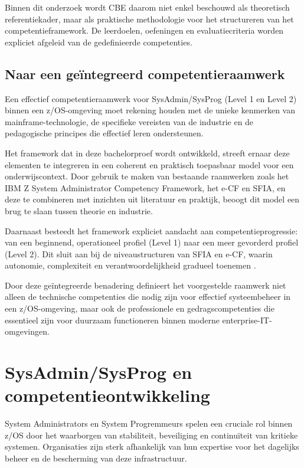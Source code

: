 Binnen dit onderzoek wordt CBE daarom niet enkel beschouwd als theoretisch referentiekader, maar als praktische methodologie voor het structureren van het competentieframework. De leerdoelen, oefeningen en evaluatiecriteria worden expliciet afgeleid van de gedefinieerde competenties.

\subsection{Naar een geïntegreerd competentieraamwerk}

Een effectief competentieraamwerk voor SysAdmin/SysProg (Level 1 en Level 2) binnen een z/OS-omgeving moet rekening houden met de unieke kenmerken van mainframe-technologie, de specifieke vereisten van de industrie en de pedagogische principes die effectief leren ondersteunen.

Het framework dat in deze bachelorproef wordt ontwikkeld, streeft ernaar deze elementen te integreren in een coherent en praktisch toepasbaar model voor een onderwijscontext. Door gebruik te maken van bestaande raamwerken zoals het IBM Z System Administrator Competency Framework, het e-CF en SFIA, en deze te combineren met inzichten uit literatuur en praktijk, beoogt dit model een brug te slaan tussen theorie en industrie.

Daarnaast besteedt het framework expliciet aandacht aan competentieprogressie: van een beginnend, operationeel profiel (Level 1) naar een meer gevorderd profiel (Level 2). Dit sluit aan bij de niveaustructuren van SFIA en e-CF, waarin autonomie, complexiteit en verantwoordelijkheid gradueel toenemen \autocite{sfia_framework,eCF_framework}.

Door deze geïntegreerde benadering definieert het voorgestelde raamwerk niet alleen de technische competenties die nodig zijn voor effectief systeembeheer in een z/OS-omgeving, maar ook de professionele en gedragscompetenties die essentieel zijn voor duurzaam functioneren binnen moderne enterprise-IT-omgevingen.

\section{SysAdmin/SysProg en competentieontwikkeling}
\label{sec:sysadmin-comp-ontwkile}

System Administrators en System Progremmeurs spelen een cruciale rol binnen z/OS door het waarborgen van stabiliteit, beveiliging en continuïteit van kritieke systemen. Organisaties zijn sterk afhankelijk van hun expertise voor het dagelijks beheer en de bescherming van deze infrastructuur.

